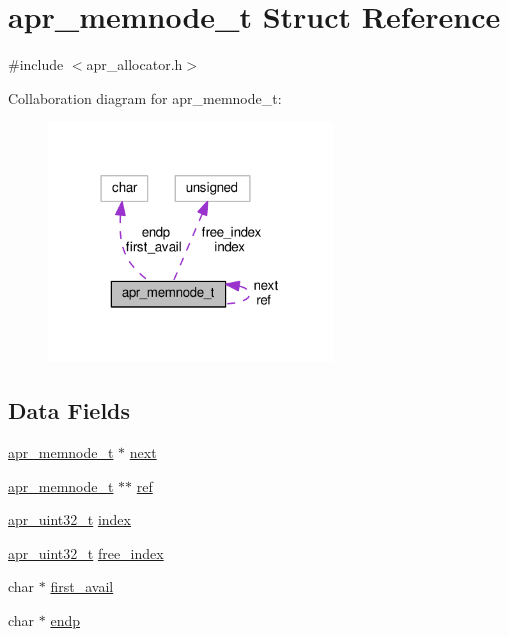 \hypertarget{structapr__memnode__t}{}\section{apr\+\_\+memnode\+\_\+t Struct Reference}
\label{structapr__memnode__t}


{\ttfamily \#include $<$apr\+\_\+allocator.\+h$>$}



Collaboration diagram for apr\+\_\+memnode\+\_\+t\+:
\nopagebreak
\begin{figure}[H]
\begin{center}
\leavevmode
\includegraphics[width=214pt]{structapr__memnode__t__coll__graph}
\end{center}
\end{figure}
\subsection*{Data Fields}
\begin{DoxyCompactItemize}
\item 
\hyperlink{structapr__memnode__t}{apr\+\_\+memnode\+\_\+t} $\ast$ \hyperlink{structapr__memnode__t_a07dd84ca152164d6bc283dbce99f8f78}{next}
\item 
\hyperlink{structapr__memnode__t}{apr\+\_\+memnode\+\_\+t} $\ast$$\ast$ \hyperlink{structapr__memnode__t_ac68a939c0c3d48498ec0c0fde409c502}{ref}
\item 
\hyperlink{group__apr__platform_ga558548a135d8a816c4787250744ea147}{apr\+\_\+uint32\+\_\+t} \hyperlink{structapr__memnode__t_a6188325f9e1cbcafcb0a65b7e41881a1}{index}
\item 
\hyperlink{group__apr__platform_ga558548a135d8a816c4787250744ea147}{apr\+\_\+uint32\+\_\+t} \hyperlink{structapr__memnode__t_af63769f30f6eb9d72e4b24050bd7a9d9}{free\+\_\+index}
\item 
char $\ast$ \hyperlink{structapr__memnode__t_a863e7980225e46678881271c4c803e4c}{first\+\_\+avail}
\item 
char $\ast$ \hyperlink{structapr__memnode__t_a35c9bf71f1cc680929f857176b547a05}{endp}
\end{DoxyCompactItemize}


